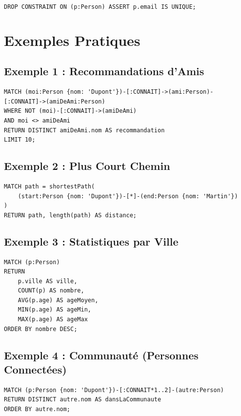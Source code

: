 \documentclass[11pt,a4paper]{article}
\begin{document}
\begin{lstlisting}
DROP CONSTRAINT ON (p:Person) ASSERT p.email IS UNIQUE;
\end{lstlisting}

\newpage

\section{Exemples Pratiques}

\subsection{Exemple 1 : Recommandations d'Amis}

\begin{lstlisting}
MATCH (moi:Person {nom: 'Dupont'})-[:CONNAIT]->(ami:Person)-[:CONNAIT]->(amiDeAmi:Person)
WHERE NOT (moi)-[:CONNAIT]->(amiDeAmi)
AND moi <> amiDeAmi
RETURN DISTINCT amiDeAmi.nom AS recommandation
LIMIT 10;
\end{lstlisting}

\subsection{Exemple 2 : Plus Court Chemin}

\begin{lstlisting}
MATCH path = shortestPath(
    (start:Person {nom: 'Dupont'})-[*]-(end:Person {nom: 'Martin'})
)
RETURN path, length(path) AS distance;
\end{lstlisting}

\subsection{Exemple 3 : Statistiques par Ville}

\begin{lstlisting}
MATCH (p:Person)
RETURN 
    p.ville AS ville,
    COUNT(p) AS nombre,
    AVG(p.age) AS ageMoyen,
    MIN(p.age) AS ageMin,
    MAX(p.age) AS ageMax
ORDER BY nombre DESC;
\end{lstlisting}

\subsection{Exemple 4 : Communauté (Personnes Connectées)}

\begin{lstlisting}
MATCH (p:Person {nom: 'Dupont'})-[:CONNAIT*1..2]-(autre:Person)
RETURN DISTINCT autre.nom AS dansLaCommunaute
ORDER BY autre.nom;
\end{lstlisting}
\end{document}
